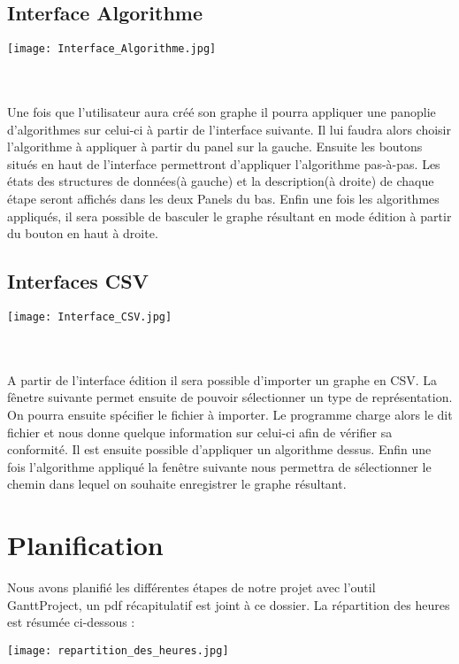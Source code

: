 \documentclass[french]{article}
\begin{document}
    \subsection{Interface Algorithme}
    \begin{minipage}{\linewidth}
    \center
       \texttt{[image: Interface\_Algorithme.jpg]}
    \end{minipage}
    \\
    \\
    Une fois que l'utilisateur aura créé son graphe il pourra appliquer une panoplie d'algorithmes sur celui-ci à partir de l'interface suivante.
    Il lui faudra alors choisir l'algorithme  à appliquer à partir du panel sur la gauche.
    Ensuite les boutons situés en haut de l'interface permettront d'appliquer l'algorithme pas-à-pas. Les états des structures de données(à gauche) et la description(à droite) de chaque étape seront affichés dans les deux Panels du bas.
    Enfin une fois les algorithmes appliqués, il sera possible de basculer le graphe résultant en mode édition à partir du bouton en haut à droite.

    \subsection{Interfaces CSV}
    \begin{minipage}{\linewidth}
    \center
       \texttt{[image: Interface\_CSV.jpg]}
    \end{minipage}
    \\
    \\
    A partir de l'interface édition il sera possible d'importer un graphe en CSV. La fênetre suivante permet ensuite de pouvoir sélectionner un type de représentation.
    On pourra ensuite spécifier le fichier à importer.
    Le programme charge alors le dit fichier et nous donne quelque information sur celui-ci afin de vérifier sa conformité.
    Il est ensuite possible d'appliquer un algorithme dessus.
    Enfin une fois l'algorithme appliqué la fenêtre suivante nous permettra de sélectionner le chemin dans lequel on souhaite enregistrer le graphe résultant.

  \section{Planification}
  Nous avons planifié les différentes étapes de notre projet avec l'outil GanttProject, un pdf récapitulatif est joint à ce dossier.
  La répartition des heures est résumée ci-dessous :
  \newline
  \begin{minipage}{\linewidth}
     \texttt{[image: repartition\_des\_heures.jpg]}
  \end{minipage}
\end{document}
